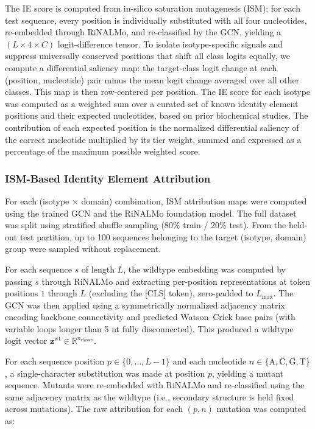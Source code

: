 \documentclass{article}
\begin{document}
The IE score is computed from in-silico saturation mutagenesis (ISM): for each test sequence, every position is individually substituted with all four nucleotides, re-embedded through RiNALMo, and re-classified by the GCN, yielding a $(L \times 4 \times C)$ logit-difference tensor. To isolate isotype-specific signals and suppress universally conserved positions that shift all class logits equally, we compute a differential saliency map: the target-class logit change at each (position, nucleotide) pair minus the mean logit change averaged over all other classes. This map is then row-centered per position. The IE score for each isotype was computed as a weighted sum over a curated set of known identity element positions and their expected nucleotides, based on prior biochemical studies. The contribution of each expected position is the normalized differential saliency of the correct nucleotide multiplied by its tier weight, summed and expressed as a percentage of the maximum possible weighted score.

\subsubsection{ISM-Based Identity Element Attribution}

For each (isotype $\times$ domain) combination, ISM attribution maps were computed using the trained GCN and the RiNALMo foundation model. The full dataset was split using stratified shuffle sampling (80\% train / 20\% test). From the held-out test partition, up to 100 sequences belonging to the target (isotype, domain) group were sampled without replacement.

For each sequence $s$ of length $L$, the wildtype embedding was computed by passing $s$ through RiNALMo and extracting per-position representations at token positions $1$ through $L$ (excluding the [CLS] token), zero-padded to $L_{\max}$. The GCN was then applied using a symmetrically normalized adjacency matrix encoding backbone connectivity and predicted Watson--Crick base pairs (with variable loops longer than 5 nt fully disconnected). This produced a wildtype logit vector $\mathbf{z}^{\mathrm{wt}} \in \mathbb{R}^{n_{\mathrm{classes}}}$.

For each sequence position $p \in \{0, \ldots, L-1\}$ and each nucleotide $n \in \{\mathrm{A}, \mathrm{C}, \mathrm{G}, \mathrm{T}\}$, a single-character substitution was made at position $p$, yielding a mutant sequence. Mutants were re-embedded with RiNALMo and re-classified using the same adjacency matrix as the wildtype (i.e., secondary structure is held fixed across mutations). The raw attribution for each $(p,n)$ mutation was computed as:
\end{document}
